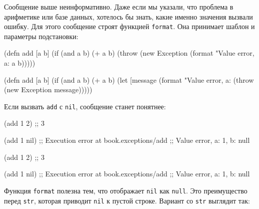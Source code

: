 \fi

Сообщение выше неинформативно. Даже если мы указали, что проблема в арифметике
или базе данных, хотелось бы знать, какие именно значения вызвали ошибку. Для
этого сообщение строят функцией \verb|format|. Она принимает шаблон и
параметры подстановки:


\ifx\DEVICETYPE\MOBILE

\begin{english}
  \begin{clojure}
(defn add [a b]
  (if (and a b)
    (+ a b)
    (throw
      (new Exception
        (format
          "Value error, a: %
          a b)))))
  \end{clojure}
\end{english}

\else

\begin{english}
  \begin{clojure}
(defn add [a b]
  (if (and a b)
    (+ a b)
    (let [message (format "Value error, a: %
      (throw (new Exception message)))))
  \end{clojure}
\end{english}

\fi

\noindent
Если вызвать \verb|add| с \verb|nil|, сообщение станет понятнее:

\ifx\DEVICETYPE\MOBILE

\begin{english}
  \begin{clojure}
(add 1 2) ;; 3

(add 1 nil)
;; Execution error at book.exceptions/add
;; Value error, a: 1, b: null
  \end{clojure}
\end{english}

\else

\begin{english}
  \begin{clojure}
(add 1 2) ;; 3

(add 1 nil)
;; Execution error at book.exceptions/add
;; Value error, a: 1, b: null
  \end{clojure}
\end{english}

\fi

Функция \verb|format| полезна тем, что отображает \verb|nil| как
\verb|null|. Это преимущество перед \verb|str|, которая приводит
\verb|nil| к пустой строке. Вариант со \verb|str| выглядит так:

